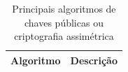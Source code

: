 \documentclass[12pt]{article}
\begin{document}
\begin{table}[h!]
\caption{Principais algoritmos de chaves públicas ou criptografia assimétrica}
\label{tab2}
\begin{tabular}{|l|l|}
\hline
Algoritmo                                                  & Descrição                                                                                                                                                                                                                                                                                                                                                                                                                                                                                                                                                                                                                                                                                                                                                                                                                                                                                                                                                                                                                                                                                                                                                                                                                                                                                                                                                                                                                                                                                                                                                                                                                                                                                                                                                                                                                                                                                                                                                                              \\ \hline

\end{tabular}
\end{table}
\end{document}
